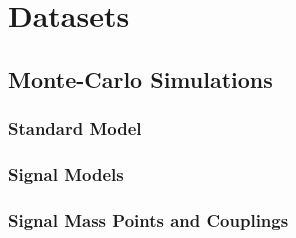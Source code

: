 
\chapter{Datasets}
\section{Monte-Carlo Simulations}
\subsection{Standard Model}
\subsection{Signal Models}
\subsection{Signal Mass Points and Couplings}